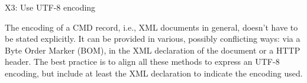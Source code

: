 X3: Use UTF-8 encoding



The encoding of a CMD record, i.e., XML documents in general, doesn't have to be stated explicitly. It can be provided in various, possibly conflicting ways: via a Byte Order Marker (BOM), in the XML declaration of the document or a HTTP header. The best practice is to align all these methods to express an UTF-8 encoding, but include at least the XML declaration to indicate the encoding used.
